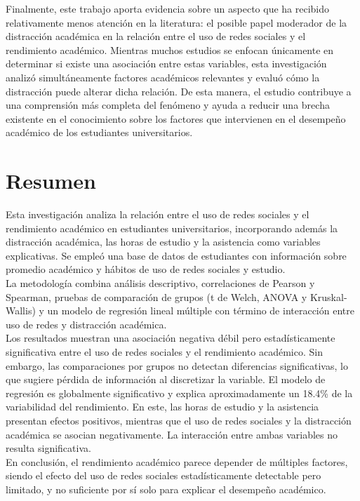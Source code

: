 \documentclass[12pt]{article}
\begin{document}
Finalmente, este trabajo aporta evidencia sobre un aspecto que ha recibido relativamente menos atención en la literatura: el posible papel moderador de la distracción académica en la relación entre el uso de redes sociales y el rendimiento académico. Mientras muchos estudios se enfocan únicamente en determinar si existe una asociación entre estas variables, esta investigación analizó simultáneamente factores académicos relevantes y evaluó cómo la distracción puede alterar dicha relación. De esta manera, el estudio contribuye a una comprensión más completa del fenómeno y ayuda a reducir una brecha existente en el conocimiento sobre los factores que intervienen en el desempeño académico de los estudiantes universitarios.

\section*{Resumen}
Esta investigación analiza la relación entre el uso de redes sociales y el rendimiento académico en estudiantes universitarios, incorporando además la distracción académica, las horas de estudio y la asistencia como variables explicativas. Se empleó una base de datos de estudiantes con información sobre promedio académico y hábitos de uso de redes sociales y estudio.\\

La metodología combina análisis descriptivo, correlaciones de Pearson y Spearman, pruebas de comparación de grupos (t de Welch, ANOVA y Kruskal-Wallis) y un modelo de regresión lineal múltiple con término de interacción entre uso de redes y distracción académica.\\

Los resultados muestran una asociación negativa débil pero estadísticamente significativa entre el uso de redes sociales y el rendimiento académico. Sin embargo, las comparaciones por grupos no detectan diferencias significativas, lo que sugiere pérdida de información al discretizar la variable. El modelo de regresión es globalmente significativo y explica aproximadamente un 18.4\% de la variabilidad del rendimiento. En este, las horas de estudio y la asistencia presentan efectos positivos, mientras que el uso de redes sociales y la distracción académica se asocian negativamente. La interacción entre ambas variables no resulta significativa.\\

En conclusión, el rendimiento académico parece depender de múltiples factores, siendo el efecto del uso de redes sociales estadísticamente detectable pero limitado, y no suficiente por sí solo para explicar el desempeño académico.
\end{document}
